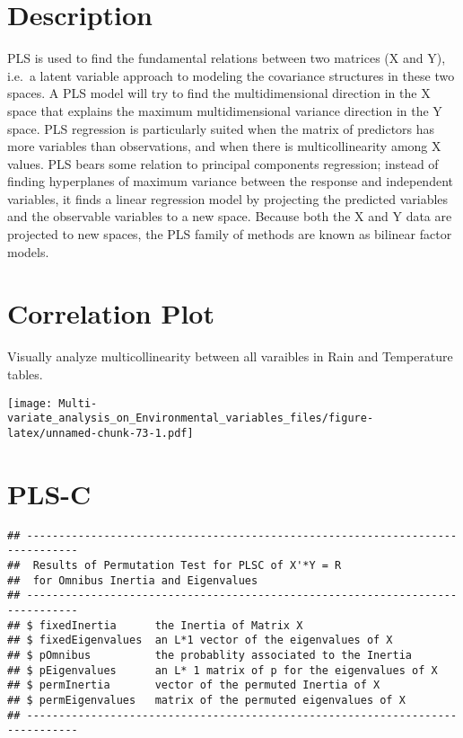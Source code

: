 \documentclass[]{book}
\begin{document}
\hypertarget{description-4}{%
\section{Description}\label{description-4}}

PLS is used to find the fundamental relations between two matrices (X
and Y), i.e.~a latent variable approach to modeling the covariance
structures in these two spaces. A PLS model will try to find the
multidimensional direction in the X space that explains the maximum
multidimensional variance direction in the Y space. PLS regression is
particularly suited when the matrix of predictors has more variables
than observations, and when there is multicollinearity among X values.
PLS bears some relation to principal components regression; instead of
finding hyperplanes of maximum variance between the response and
independent variables, it finds a linear regression model by projecting
the predicted variables and the observable variables to a new space.
Because both the X and Y data are projected to new spaces, the PLS
family of methods are known as bilinear factor models.

\hypertarget{correlation-plot-1}{%
\section{Correlation Plot}\label{correlation-plot-1}}

Visually analyze multicollinearity between all varaibles in Rain and
Temperature tables.

\texttt{[image: Multi-variate\_analysis\_on\_Environmental\_variables\_files/figure-latex/unnamed-chunk-73-1.pdf]}

\hypertarget{pls-c}{%
\section{PLS-C}\label{pls-c}}

\begin{verbatim}
## ------------------------------------------------------------------------------
##  Results of Permutation Test for PLSC of X'*Y = R 
##  for Omnibus Inertia and Eigenvalues 
## ------------------------------------------------------------------------------
## $ fixedInertia      the Inertia of Matrix X
## $ fixedEigenvalues  an L*1 vector of the eigenvalues of X
## $ pOmnibus          the probablity associated to the Inertia
## $ pEigenvalues      an L* 1 matrix of p for the eigenvalues of X
## $ permInertia       vector of the permuted Inertia of X
## $ permEigenvalues   matrix of the permuted eigenvalues of X
## ------------------------------------------------------------------------------
\end{verbatim}
\end{document}
